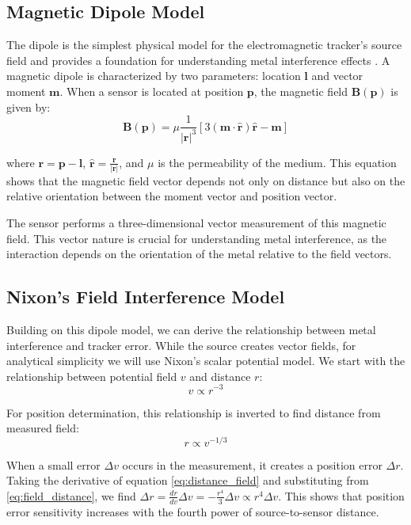 \documentclass[journal,twoside,web]{ieeecolor}
\begin{document}
\subsection{Magnetic Dipole Model}

The dipole is the simplest physical model for the electromagnetic tracker's source field and provides a foundation for understanding metal interference effects \cite{griffiths_introduction_1999}. A magnetic dipole is characterized by two parameters: location $\mathbf{l}$ and vector moment $\mathbf{m}$. When a sensor is located at position $\mathbf{p}$, the magnetic field $\mathbf{B}(\mathbf{p})$ is given by:
\begin{equation}
\mathbf{B}(\mathbf{p}) = \mu \frac{1}{|\mathbf{r}|^3} [3(\mathbf{m} \cdot \mathbf{\hat{r}})\mathbf{\hat{r}} - \mathbf{m}]
\label{eq:dipole_field}
\end{equation}

where $\mathbf{r} = \mathbf{p} - \mathbf{l}$, $\mathbf{\hat{r}} = \frac{\mathbf{r}}{|\mathbf{r}|}$, and $\mu$ is the permeability of the medium. This equation shows that the magnetic field vector depends not only on distance but also on the relative orientation between the moment vector and position vector.

The sensor performs a three-dimensional vector measurement of this magnetic field. This vector nature is crucial for understanding metal interference, as the interaction depends on the orientation of the metal relative to the field vectors.
\subsection{Nixon's Field Interference Model}
\label{nixon_model}
Building on this dipole model, we can derive the relationship between metal interference and tracker error. While the source creates vector fields, for analytical simplicity we will use Nixon's scalar potential model\cite{nixon_effects_1998}. We start with the relationship between potential field $v$ and distance $r$:
\begin{equation}
v \propto r^{-3}
\label{eq:field_distance}
\end{equation}

For position determination, this relationship is inverted to find distance from measured field:
\begin{equation}
r \propto v^{-1/3}
\label{eq:distance_field}
\end{equation}

When a small error $\Delta v$ occurs in the measurement, it creates a position error $\Delta r$. Taking the derivative of equation \eqref{eq:distance_field} and substituting from \eqref{eq:field_distance}, we find $\Delta r = \frac{dr}{dv}\Delta v = -\frac{r^4}{3}\Delta v\propto r^4\Delta v$. This shows that position error sensitivity increases with the fourth power of source-to-sensor distance.
\end{document}
